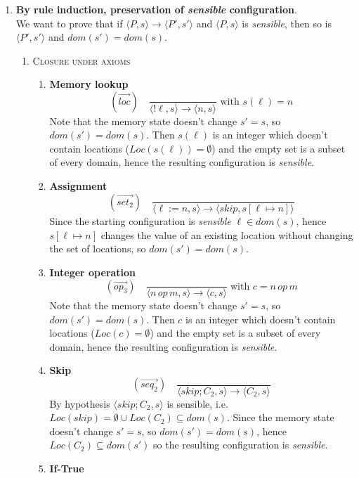 \begin{solution}
\begin{enumerate}
\begin{enumerate}
    \end{enumerate}
    \item \textbf{By rule induction, preservation of \textit{sensible} configuration}. \\
    We want to prove that if $\langle P,s \rangle \rightarrow \langle P',s' \rangle$ and $\langle P,s \rangle$ is \textit{sensible}, then so is $\langle P',s' \rangle$ and $dom(s') = dom(s)$.
    \begin{enumerate}
        \item \textsc{Closure under axioms}
        \begin{enumerate}
            \item \textbf{Memory lookup}
            \[(\overset{\rightarrow}{loc} ) \quad \frac{}{\langle !\ell ,s \rangle \to \langle n,s\rangle} \text{ with }  s(\ell) = n\]
            Note that the memory state doesn't change $s'=s$, so $dom(s') = dom(s)$. Then $s(\ell)$ is an integer which doesn't contain locations ($Loc(s(\ell))= \emptyset$) and the empty set is a subset of every domain, hence the resulting configuration is \textit{sensible}.
            \item \textbf{Assignment}
             \[ (\overset{\rightarrow}{set_2}) \quad \frac{}{\langle \ell:=n,s\rangle \to \langle skip, s[\ell \mapsto n]\rangle}\]
             Since the starting configuration is \textit{sensible} $\ell \in dom(s)$, hence $s[\ell \mapsto n]$ changes the value of an existing location without changing the set of locations, so $dom(s') = dom(s)$.
            \item \textbf{Integer operation}
             \[ (\overset{\rightarrow}{op_3}) \quad \frac{}{\langle n \, op \, m,s\rangle \to \langle c, s\rangle} \; \text{with } c = n \, op \, m\]
              Note that the memory state doesn't change $s'=s$, so $dom(s') = dom(s)$. Then $c$ is an integer which doesn't contain locations ($Loc(c)= \emptyset$) and the empty set is a subset of every domain, hence the resulting configuration is \textit{sensible}.
              \item \textbf{Skip}
             \[ (\overset{\rightarrow}{seq_2}) \quad \frac{}{\langle skip;C_2,s\rangle \to \langle C_2,s\rangle}\]
              By hypothesis $\langle skip;C_2,s\rangle$ is sensible, i.e. $Loc(skip)=\emptyset \cup Loc(C_2) \subseteq dom(s) $. Since the memory state doesn't change $s'=s$, so $dom(s') = dom(s)$, hence $Loc(C_2) \subseteq dom(s') $ so the resulting configuration is \textit{sensible}.
               \item \textbf{If-True}

\end{enumerate}
\end{enumerate}
\end{enumerate}
\end{solution}
